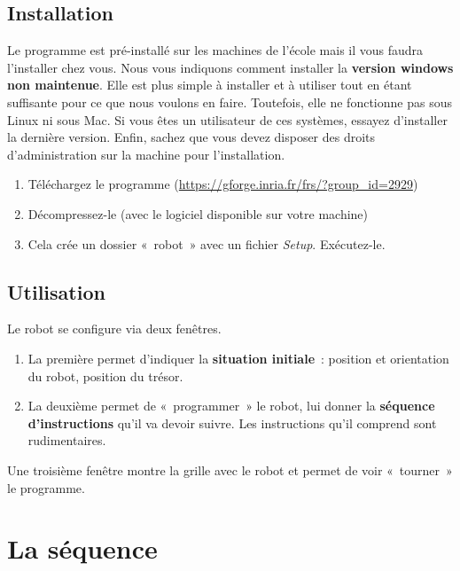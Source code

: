 	\subsection{Installation}

		Le programme est pré-installé sur les machines de
		l'école mais il vous faudra
		l'installer chez vous. Nous vous indiquons comment
		installer la \textbf{version windows non maintenue}. Elle est plus
		simple à installer et à utiliser tout en étant suffisante pour ce que
		nous voulons en faire. Toutefois, elle ne fonctionne pas sous Linux ni
		sous Mac. Si vous êtes un utilisateur de ces systèmes, essayez
		d'installer la dernière version. Enfin, sachez que
		vous devez disposer des droits d'administration sur la
		machine pour l'installation.

		\begin{enumerate}
		\item
			Téléchargez le programme
			(\url{https://gforge.inria.fr/frs/?group\_id=2929})
		\item 
			Décompressez-le (avec le logiciel disponible sur votre machine)
		\item
			Cela crée un dossier «~robot~» avec un fichier \textit{Setup}.
			Exécutez-le.
		\end{enumerate}

	\subsection{Utilisation}

		Le robot se configure via deux fenêtres.

		\begin{enumerate}
		\item 
			La première permet d'indiquer la \textbf{situation
			initiale}~: position et orientation du robot, position du trésor.
		\item 
			La deuxième permet de «~programmer~» le robot, lui donner la
			\textbf{séquence d'instructions}
			qu'il va devoir suivre. Les instructions
			qu'il comprend sont rudimentaires. 
		\end{enumerate}

		Une troisième fenêtre montre la grille avec le robot et permet de voir
		«~tourner~» le programme.

\section{La séquence}

